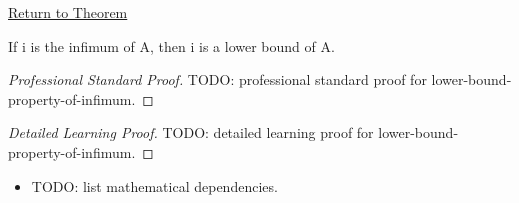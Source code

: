 \newpage
{}
\label{prf:lower-bound-property-of-infimum}

\begin{remark*}[Return]
\hyperref[prop:lower-bound-property-of-infimum]{Return to Theorem}
\end{remark*}

\begin{proposition*}
If i is the infimum of A, then i is a lower bound of A.
\end{proposition*}

\begin{proof}[Professional Standard Proof]
\LRAProofBodyStart
TODO: professional standard proof for lower-bound-property-of-infimum.
\end{proof}

\begin{proof}[Detailed Learning Proof]
\LRAProofBodyStart
TODO: detailed learning proof for lower-bound-property-of-infimum.
\end{proof}

\begin{remark*}
\end{remark*}

\begin{dependencies}
\begin{itemize}
  \item TODO: list mathematical dependencies.
\end{itemize}
\end{dependencies}

\clearpage

